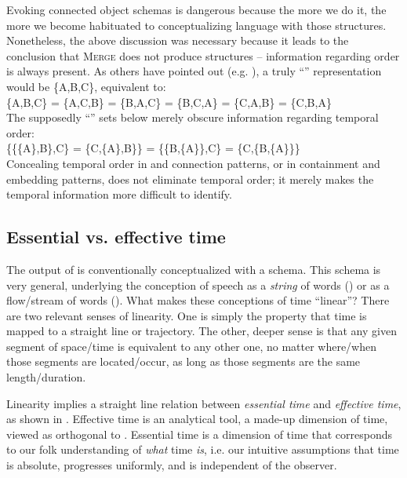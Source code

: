   Evoking connected object schemas is dangerous because the more we do it, the more we become habituated to conceptualizing language with those structures. Nonetheless, the above discussion was necessary because it leads to the conclusion that \textsc{Merge} does not produce  structures -- information regarding order is always present. As others have pointed out (e.g. \citealt{Yang1999}), a truly “” representation would be \{A,B,C\}, equivalent to:\\

  \{A,B,C\} = \{A,C,B\} = \{B,A,C\} = \{B,C,A\} = \{C,A,B\} = \{C,B,A\}\\

The supposedly “” sets below merely obscure information regarding temporal order:\\

  \{\{\{A\},B\},C\} = \{C,\{A\},B\}\} = \{\{B,\{A\}\},C\} = \{C,\{B,\{A\}\}\}\\

 Concealing temporal order in  and connection patterns, or in containment and embedding patterns, does not eliminate temporal order; it merely makes the temporal information more difficult to identify. 

\subsection{Essential vs. effective time}

The output of  is conventionally conceptualized with a  schema. This  schema is very general, underlying the conception of speech as a \textit{string} of words () or as a flow/stream of words (). What makes these conceptions of time “linear”?  There are two relevant senses of linearity. One is simply the property that time is mapped to a straight line or trajectory. The other, deeper sense is that any given segment of space/time is equivalent to any other one, no matter where/when those segments are located/occur, as long as those segments are the same length/duration. 

  Linearity implies a straight line relation between \textit{essential time} and \textit{effective time}, as shown in {}. Effective time is an analytical tool, a made-up dimension of time, viewed as orthogonal to . Essential time is a dimension of time that corresponds to our folk understanding of \textit{what} time \textit{is}, i.e. our intuitive assumptions that time is absolute, progresses uniformly, and is independent of the observer.

